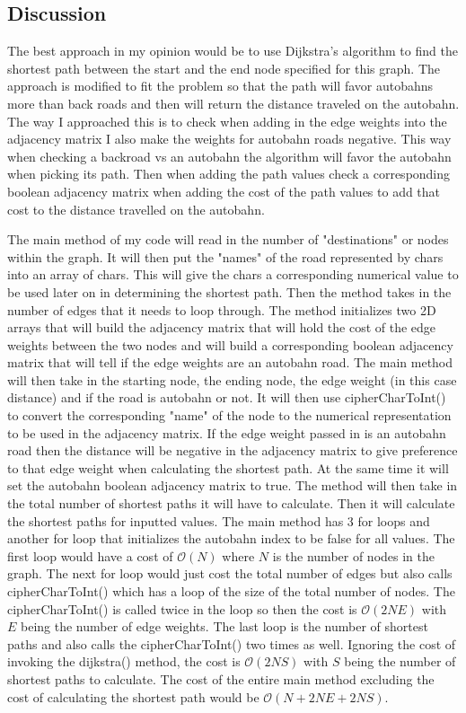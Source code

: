 \documentclass[11pt]{article}
\begin{document}
\subsection{Discussion}
The best approach in my opinion would be to use Dijkstra's algorithm to find the shortest path between the start and the end node specified for this graph. The approach is modified to fit the problem so that the path will favor autobahns more than back roads and then will return the distance traveled on the autobahn. The way I approached this is to check when adding in the edge weights into the adjacency matrix I also make the weights for autobahn roads negative. This way when checking a backroad vs an autobahn the algorithm will favor the autobahn when picking its path. Then when adding the path values check a corresponding boolean adjacency matrix when adding the cost of the path values to add that cost to the distance travelled on the autobahn.

The main method of my code will read in the number of "destinations" or nodes within the graph. It will then put the "names" of the road represented by chars into an array of chars. This will give the chars a corresponding numerical value to be used later on in determining the shortest path. Then the method takes in the number of edges that it needs to loop through. The method initializes two 2D arrays that will build the adjacency matrix that will hold the cost of the edge weights between the two nodes and will build a corresponding boolean adjacency matrix that will tell if the edge weights are an autobahn road. The main method will then take in the starting node, the ending node, the edge weight (in this case distance) and if the road is autobahn or not. It will then use cipherCharToInt() to convert the corresponding "name" of the node to the numerical representation to be used in the adjacency matrix. If the edge weight passed in is an autobahn road then the distance will be negative in the adjacency matrix to give preference to that edge weight when calculating the shortest path. At the same time it will set the autobahn boolean adjacency matrix to true. The method will then take in the total number of  shortest paths it will have to calculate. Then it will calculate the shortest paths for inputted values. The main method has 3 for loops and another for loop that initializes the autobahn index to be false for all values. The first loop would have a cost of $\mathcal{O}(N)$ where $N$ is the number of nodes in the graph. The next for loop would just cost the total number of edges but also calls cipherCharToInt() which has a loop of the size of the total number of nodes. The cipherCharToInt() is called twice in the loop so then the cost is $\mathcal{O}(2NE)$ with $E$ being the number of edge weights. The last loop is the number of shortest paths and also calls the cipherCharToInt() two times as well. Ignoring the cost of invoking the dijkstra() method, the cost is $\mathcal{O}(2NS)$ with $S$ being the number of shortest paths to calculate. The cost of the entire main method excluding the cost of calculating the shortest path would be $\mathcal{O}( N + 2NE + 2NS)$.
\end{document}
